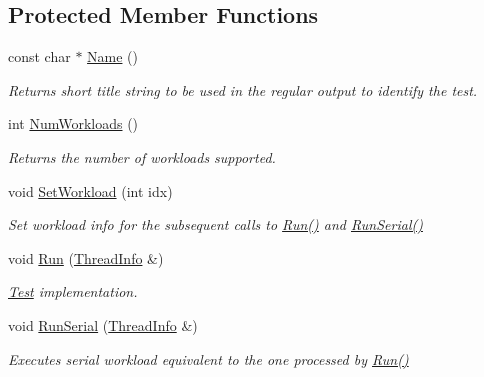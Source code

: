 \subsection*{Protected Member Functions}
\begin{DoxyCompactItemize}
\item 
const char $\ast$ \hyperlink{classTest__SPMC_a461ecee8efb0d49bdaa93e10d4f3da3a}{Name} ()
\begin{DoxyCompactList}\small\item\em Returns short title string to be used in the regular output to identify the test. \end{DoxyCompactList}\item 
\hypertarget{classTest__SPMC_a24d8399150aa2a41577d5bed79447174}{}int \hyperlink{classTest__SPMC_a24d8399150aa2a41577d5bed79447174}{Num\+Workloads} ()\label{classTest__SPMC_a24d8399150aa2a41577d5bed79447174}

\begin{DoxyCompactList}\small\item\em Returns the number of workloads supported. \end{DoxyCompactList}\item 
void \hyperlink{classTest__SPMC_acbd5640f40c9ad5718de33aa708d07d0}{Set\+Workload} (int idx)
\begin{DoxyCompactList}\small\item\em Set workload info for the subsequent calls to \hyperlink{classTest__SPMC_ae9aa674af5d72d2615202ca7a22dadc0}{Run()} and \hyperlink{classTest__SPMC_a4e252a3e4b1ab3c4505d5347828c80c6}{Run\+Serial()} \end{DoxyCompactList}\item 
void \hyperlink{classTest__SPMC_ae9aa674af5d72d2615202ca7a22dadc0}{Run} (\hyperlink{structPerf_1_1Test_1_1ThreadInfo}{Thread\+Info} \&)
\begin{DoxyCompactList}\small\item\em \hyperlink{classTest}{Test} implementation. \end{DoxyCompactList}\item 
void \hyperlink{classTest__SPMC_a4e252a3e4b1ab3c4505d5347828c80c6}{Run\+Serial} (\hyperlink{structPerf_1_1Test_1_1ThreadInfo}{Thread\+Info} \&)
\begin{DoxyCompactList}\small\item\em Executes serial workload equivalent to the one processed by \hyperlink{classTest__SPMC_ae9aa674af5d72d2615202ca7a22dadc0}{Run()} \end{DoxyCompactList}\end{DoxyCompactItemize}
